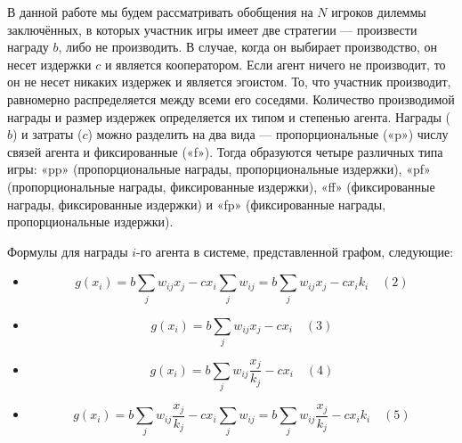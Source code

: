 \documentclass[12pt]{extarticle}
\begin{document}

В данной работе мы будем рассматривать обобщения на $N$ игроков дилеммы заключённых, в которых участник игры имеет две стратегии --- произвести награду $b$, либо не производить. 
В случае, когда он выбирает производство, он несет издержки $c$ и является кооператором. Если агент ничего не производит, то он не несет никаких издержек и является эгоистом. То, что участник производит, равномерно распределяется между всеми его соседями. Количество производимой награды и размер издержек определяется их типом и степенью агента. Награды ($b$) и затраты ($c$) можно разделить на два вида --- пропорциональные («p») числу связей агента и фиксированные («f»). Тогда образуются четыре различных типа игры: «pp» (пропорциональные награды, пропорциональные издержки), «pf» (пропорциональные награды, фиксированные издержки), «ff» (фиксированные награды, фиксированные издержки) и «fp» (фиксированные награды, пропорциональные издержки).

Формулы для награды $i$-го агента в системе, представленной графом, следующие:

\begin{itemize}
\item[«pp» игра]
\[
g(x_i) = b \sum_j w_{ij}x_j - c x_i \sum_j w_{ij} = b \sum_j w_{ij}x_j - c x_i k_i \quad (2)
\]
\item[«pf» игра]
\[
g(x_i) = b \sum_j w_{ij}x_j - c x_i \quad (3)
\]
\item[«ff» игра]
\[
g(x_i) = b \sum_j w_{ij} \frac{x_j}{k_j} - c x_i \quad (4)
\]
\item[«fp» игра]
\[
g(x_i) = b \sum_j w_{ij} \frac{x_j}{k_j} - c x_i \sum_j w_{ij} = b \sum_j w_{ij} \frac{x_j}{k_j} - c x_i k_i \quad (5)
\]
\end{itemize}
\end{document}
